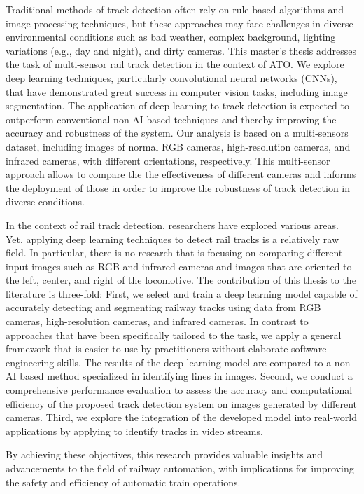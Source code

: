 \documentclass[Master,MDS,english]{BASE/twbook} %
\begin{document}
Traditional methods of track detection often rely on rule-based algorithms and image processing techniques, but these approaches may face challenges in diverse environmental conditions such as bad weather, complex background, lighting variations (e.g., day and night), and dirty cameras.
This master's thesis addresses the task of multi-sensor rail track detection in the context of ATO. We explore deep learning techniques, particularly convolutional neural networks (CNNs), that have demonstrated great success in computer vision tasks, including image segmentation. The application of deep learning to track detection is expected to outperform conventional non-AI-based techniques and thereby improving the accuracy and robustness of the system.
Our analysis is based on a multi-sensors dataset, including images of normal RGB cameras, high-resolution cameras, and infrared cameras, with different orientations, respectively. This multi-sensor approach allows to compare the the effectiveness of different cameras and informs the deployment of those in order to improve the robustness of track detection in diverse conditions. 

In the context of rail track detection, researchers have explored various areas. Yet, applying deep learning techniques to detect rail tracks is a relatively raw field. In particular, there is no research that is focusing on comparing different input images such as RGB and infrared cameras and images that are oriented to the left, center, and right of the locomotive. 
The contribution of this thesis to the literature is three-fold: First, we select and train a deep learning model capable of accurately detecting and segmenting railway tracks using data from RGB cameras, high-resolution cameras, and infrared cameras. In contrast to approaches that have been specifically tailored to the task, we apply a general framework that is easier to use by practitioners without elaborate software engineering skills.
The results of the deep learning model are compared to a non-AI based method specialized in identifying lines in images. 
Second, we conduct a comprehensive performance evaluation to assess the accuracy and computational efficiency of the proposed track detection system on images generated by different cameras.
Third, we explore the integration of the developed model into real-world applications by applying to identify tracks in video streams. 

By achieving these objectives, this research provides valuable insights and advancements to the field of railway automation, with implications for improving the safety and efficiency of automatic train operations.
\end{document}
